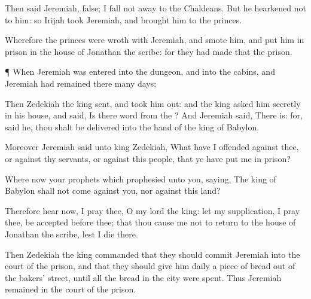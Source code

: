 {Then
said
Jeremiah,
{}
false; I fall not
away to the
Chaldeans. But he
hearkened not to him: so
Irijah
took
Jeremiah, and
brought him to the
princes.

Wherefore the
princes were
wroth with
Jeremiah, and
smote him, and
put him in
prison in the
house of
Jonathan the
scribe: for they had
made that the
prison.


\par }{\PP {}¶ When
Jeremiah was
entered into the
dungeon, and into the
cabins, and
Jeremiah had
remained there
many
days;

Then
Zedekiah the
king
sent, and took him
out: and the
king
asked him
secretly in his
house, and
said, Is there
{}
word from the
{}? And
Jeremiah
said, There
is: for,
said he, thou shalt be
delivered into the
hand of the
king of
Babylon.

Moreover
Jeremiah
said unto
king
Zedekiah, What have I
offended against thee, or against thy
servants, or against this
people, that ye have
put me in
prison?

Where
{}
now your
prophets which
prophesied unto you,
saying, The
king of
Babylon shall not
come against you, nor against this
land?

Therefore
hear now, I pray thee, O my
lord the
king: let my
supplication, I pray thee, be
accepted
before thee; that thou cause me not to
return to the
house of
Jonathan the
scribe, lest I
die there.

Then
Zedekiah the
king
commanded that they should
commit
Jeremiah into the
court of the
prison, and that they should
give him
daily a
piece of
bread out of the
bakers’
street, until all the
bread in the
city were
spent. Thus
Jeremiah
remained in the
court of the
prison.




\par }
